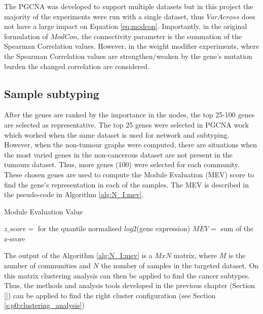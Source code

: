 The PGCNA was developed to support multiple datasets but in this project the majority of the experiments were run with a single dataset, thus $VarAcross$ does not have a large impact on Equation \ref{eq:modcon}. Importantly, in the original formulation of $ModCon$, the connectivity parameter is the summation of the Spearman Correlation values. However, in the weight modifier experiments, where the Spearman Correlation values are strengthen/weaken by the gene's mutation burden the changed correlation are considered.

\subsection{Sample subtyping} \label{s:N_I:mev}

After the genes are ranked by the importance in the nodes, the top 25-100 genes are selected as representative. The top 25 genes were selected in PGCNA work \cite{Care2019-ij} which worked when the same dataset is used for network and subtyping. However, when the non-tumour graphs were computed, there are situations when the most varied genes in the non-cancerous dataset are not present in the tumours dataset. Thus, more genes (100) were selected for each community. These chosen genes are used to compute the Module Evaluation (MEV) score \citet{Care2019-ij} to find the gene's representation in each of the samples. The MEV is described in the pseudo-code in Algorithm \ref{alg:N_I:mev}.

\begin{algorithm}
\caption{Module Evaluation Value }\label{alg:N_I:mev}
    \begin{algorithmic}
            \State $z\_score=$ for the quantile normalised $log2$(gene expression)
                \State $MEV=$ sum of the z-score  
            \EndFor
        \EndFor
    \EndFor
    \end{algorithmic}
\end{algorithm}

The output of the Algorithm \ref{alg:N_I:mev} is a $MxN$ matrix, where $M$ is the number of communities and $N$ the number of samples in the targeted dataset. On this matrix clustering analysis can then be applied to find the cancer subtypes. Thus, the methods and analysis tools developed in the previous chapter (Section \ref{}) can be applied to find the right cluster configuration (see Section \ref{s:p0:clustering_analysis})
